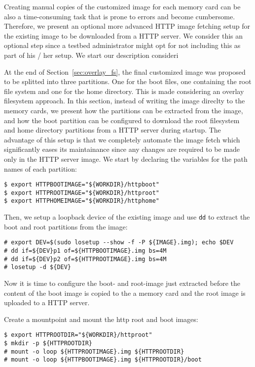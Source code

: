 \label{sec:testbed_http}
Creating manual copies of the customized image for each memory card can
be also a time-consuming task that is prone to errors and become
cumbersome. Therefore, we present an optional more advanced \ac{HTTP}
image fetching setup for the existing image to be downloaded from a
\ac{HTTP} server. We consider this an optional step since a testbed
administrator might opt for not including this as part of his / her setup.
We start our description consideri

At the end of Section~\ref{sec:overlay_fs}, the final customized image was
proposed to be splitted into three partitions. One for the boot files, one
containing the root file system and one for the home directory. This is made
considering an overlay filesystem approach. In this section, instead of
writing the image direclty to the memory cards, we present how the
partitions can be extracted from the image, and how the boot partition can
be configured to download the root filesystem and home directory partitions
from a \ac{HTTP} server during startup. The advantage of this setup is that
we completely automate the image fetch which significantly eases its
maintainance since any changes are required to be made only in the \ac{HTTP}
server image. We start by declaring the variables for the path names of each
partition:

\begin{lstlisting}[]
$ export HTTPBOOTIMAGE="${WORKDIR}/httpboot"
$ export HTTPROOTIMAGE="${WORKDIR}/httproot"
$ export HTTPHOMEIMAGE="${WORKDIR}/httphome"
\end{lstlisting}
\FloatBarrier
\vspace{-5mm}

Then, we setup a loopback device of the existing image and use \texttt{dd} to
extract the boot and root partitions from the image:
\begin{lstlisting}[]
# export DEV=$(sudo losetup --show -f -P ${IMAGE}.img); echo $DEV
# dd if=${DEV}p1 of=${HTTPBOOTIMAGE}.img bs=4M
# dd if=${DEV}p2 of=${HTTPROOTIMAGE}.img bs=4M
# losetup -d ${DEV}
\end{lstlisting}
\FloatBarrier
\vspace{-5mm}

Now it is time to configure the boot- and root-image just extracted before
the content of the boot image is copied to the a memory card and the root
image is uploaded to a \ac{HTTP} server.

Create a mountpoint and mount the http root and boot images:
\begin{lstlisting}[]
$ export HTTPROOTDIR="${WORKDIR}/httproot"
$ mkdir -p ${HTTPROOTDIR}
# mount -o loop ${HTTPROOTIMAGE}.img ${HTTPROOTDIR}
# mount -o loop ${HTTPBOOTIMAGE}.img ${HTTPROOTDIR}/boot
\end{lstlisting}
\FloatBarrier
\vspace{-5mm}


